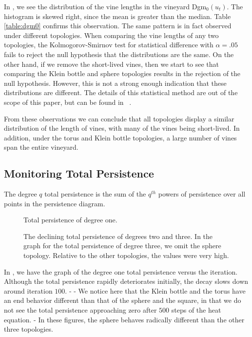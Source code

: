 In , we see the distribution of the vine lengths in 
the vineyard Dgm$_0(u_t)$.  The histogram is skewed right, since the mean is 
greater than the median.  Table \ref{table:dgm0} confirms this observation.  
The same pattern is in fact observed under different topologies.  When 
comparing the vine lengths of any two topologies, the Kolmogorov-Smirnov test 
for statistical difference with $\alpha=.05$ fails to reject the null 
hypothesis that the distributions are the same.  On the other hand, if we 
remove the short-lived vines, then we start to see that comparing the Klein
bottle and sphere topologies results in the rejection of the null hypothesis.   
However, this is not a strong enough indication that these distributions are 
different.  The details of this statistical method are out of the scope of 
this paper, but can be found in ~\cite{massey1951kolmogorov}.

From these observations we can conclude that all topologies display a similar
distribution of the length of vines, with many of the vines being short-lived.  
In addition, under the torus and Klein bottle topologies, a large number
of vines span the entire vineyard.

\subsection{Monitoring Total Persistence}
The degree $q$ total persistence is the sum  of the $q^{th}$ powers of 
persistence over all points in the persistence diagram.
\begin{figure}[hbt]
 \vspace*{0.1in}
 \centering
 \centerline{}
 \caption{Total persistence of degree one.}
 \label{fig:totalPersis}
\end{figure}
\begin{figure}[hbt]
	\centering
 \caption{The declining total persistence of degrees two and three.  In the graph for
          the total persistence of degree three, we omit the sphere topology.  Relative
          to the other topologies, the values were very high.}
 \label{fig:totalPersis23}
\end{figure}
In , we have the graph of the degree one total persistence
versus the iteration.  Although the total persistence rapidly 
deteriorates initially, the decay slows down around iteration $100$.
-
-
We notice here that the Klein bottle and the
torus have an end behavior different than that of the sphere and the square,
in that we do not see the total persistence approaching zero
after $500$ steps of the heat equation.  
-
In these figures, the sphere behaves
radically different than the other three topologies.

